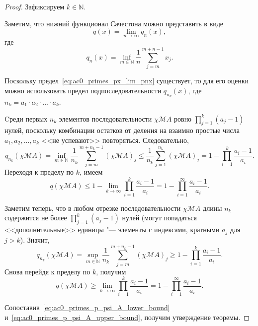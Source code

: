 \documentclass[a4paper,openbib]{article}
\theoremstyle{definition}
\begin{document}
\begin{proof}
	Зафиксируем $k\in\mathbb{N}$.

	Заметим, что нижний функционал Сачестона можно представить в виде
	\begin{equation}
		\label{eq:ac0_primes_px_lim_pnx}
		q(x) = \lim_{n\to\infty} q_n(x)
		,
	\end{equation}
	где
	\begin{equation}
		q_n(x) = \inf_{m\in\mathbb{N}}  \frac{1}{n} \sum_{j=m}^{m+n-1} x_j
		.
	\end{equation}

	Поскольку предел~\eqref{eq:ac0_primes_px_lim_pnx} существует, то для его оценки можно использовать предел подпоследовательности
	$q_{n_k}(x)$, где $n_k = a_1\cdot a_2 \cdot ... \cdot a_k$.


	Cреди первых $n_k$ элементов последовательности $\chi\mathscr{M}A$
	ровно $\prod_{j=1}^k (a_j-1)$ нулей, поскольку комбинации остатков от деления
	на взаимно простые числа $a_1, a_2, ..., a_k$ <<не успевают>> повторяться.
	Следовательно,
	\begin{equation}
		q_{n_k}(\chi\mathscr{M}A) =
		\inf_{m\in\mathbb{N}}  \frac{1}{n_k} \sum_{j=m}^{m+n_k-1} (\chi\mathscr{M}A)_j
		\leq
		\frac{1}{n_k} \sum_{j=1}^{n_k} (\chi\mathscr{M}A)_j
		=
		1-\prod_{i=1}^k \frac{a_i-1}{a_i}
		.
	\end{equation}
	Переходя к пределу по $k$, имеем
	\begin{equation}
		\label{eq:ac0_primes_p_psi_A_lower_bound}
		q(\chi\mathscr{M}A) \leq 1-\lim_{k\to \infty} \prod_{i=1}^k \frac{a_i-1}{a_i}
		=
		1-\prod_{i=1}^\infty \frac{a_i-1}{a_i}
		.
	\end{equation}

	Заметим теперь, что в любом отрезке последовательности $\chi\mathscr{M}A$ длины $n_k$
	содержится не более $\prod_{j=1}^k (a_j-1)$ нулей
	(могут попадаться <<дополнительные>> единицы "--- элементы с индексами, кратными $a_j$ для $j>k$).
	Значит,
	\begin{equation}
		q_{n_k}(\chi\mathscr{M}A) =
		\sup_{m\in\mathbb{N}}  \frac{1}{n_k} \sum_{j=m}^{m+n_k-1} (\chi\mathscr{M}A)_j
		\geq
		1-\prod_{i=1}^k \frac{a_i-1}{a_i}
		.
	\end{equation}
	Снова перейдя к пределу по $k$, получим
	\begin{equation}
		\label{eq:ac0_primes_p_psi_A_upper_bound}
		q(\chi\mathscr{M}A) \geq \lim_{k\to \infty} \prod_{i=1}^k \frac{a_i-1}{a_i}
		=
		1-\prod_{i=1}^\infty \frac{a_i-1}{a_i}
		.
	\end{equation}

	Сопоставив~\eqref{eq:ac0_primes_p_psi_A_lower_bound} и~\eqref{eq:ac0_primes_p_psi_A_upper_bound}, получим утверждение теоремы.
\end{proof}
\end{document}
